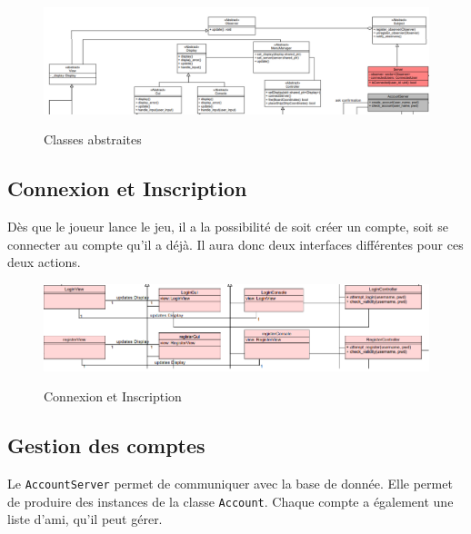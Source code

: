 \documentclass[../design_fonctionnement_sys.tex]{subfiles}
\begin{document}
\begin{figure}[H]
    \centering
    \includegraphics[scale=0.6]{img_design/Abstract.png}
    \label{fig:seq_match_server}
    \caption{Classes abstraites}
\end{figure}

\subsection{Connexion et Inscription}
Dès que le joueur lance le jeu, il a la possibilité de soit créer un compte, soit se connecter au compte qu'il a déjà. 
Il aura donc deux interfaces différentes pour ces deux actions.
\begin{figure}[H]
    \centering
    \includegraphics[scale=0.6]{img_design/Connexion_et_inscription.png}
    \label{fig:seq_match_server}
    \caption{Connexion et Inscription}
\end{figure}


\subsection{Gestion des comptes}
Le \texttt{AccountServer} permet de communiquer avec la base de donnée. Elle permet de produire des instances de la classe \texttt{Account}. 
Chaque compte a également une liste d'ami, qu'il peut gérer.
\end{document}
